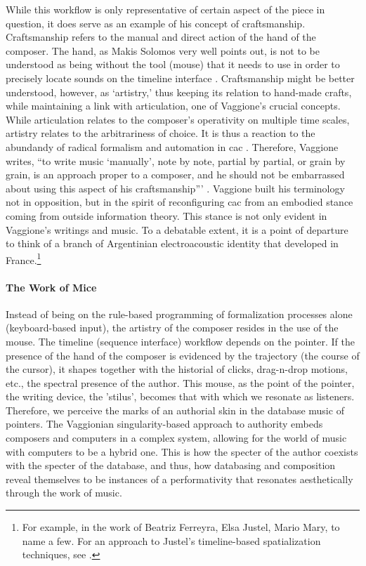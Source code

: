 While this workflow is only representative of certain aspect of the piece in question, it does serve as an example of his concept of craftsmanship. Craftsmanship refers to the manual and direct action of the hand of the composer. The hand, as Makis Solomos very well points out, is not to be understood as being without the tool (mouse) that it needs to use in order to precisely locate sounds on the timeline interface \parencite[4]{Sol05:AnI}. Craftsmanship might be better understood, however, as `artistry,' thus keeping its relation to hand-made crafts, while maintaining a link with articulation, one of Vaggione's crucial concepts. While articulation relates to the composer's operativity on multiple time scales, artistry relates to the arbitrariness of choice. It is thus a reaction to the abundandy of radical formalism and automation in \gls{cac} \parencite[3]{Sol05:AnI}. Therefore, Vaggione writes, ``to write music `manually', note by note, partial by partial, or grain by grain, is an approach proper to a composer, and he should not be embarrassed about using this aspect of his craftsmanship''' \parencite[3]{Sol05:AnI}. Vaggione built his terminology not in opposition, but in the spirit of reconfiguring \gls{cac} from an embodied stance coming from outside information theory. This stance is not only evident in Vaggione's writings and music. To a debatable extent, it is a point of departure to think of a branch of Argentinian electroacoustic identity that developed in France.\footnote{For example, in the work of Beatriz Ferreyra, Elsa Justel, Mario Mary, to name a few. For an approach to Justel's timeline-based spatialization techniques, see \parencite{fdch/papers/elsa}.} 


\paragraph{The Work of Mice}
Instead of being on the rule-based programming of formalization processes alone (keyboard-based input), the artistry of the composer resides in the use of the mouse. The timeline (sequence interface) workflow depends on the pointer. If the presence of the hand of the composer is evidenced by the trajectory (the course of the cursor), it shapes together with the historial of clicks, drag-n-drop motions, etc., the spectral presence of the author. This mouse, as the point of the pointer, the writing device, the 'stilus', becomes that with which we resonate as listeners. Therefore, we perceive the marks of an authorial skin in the database music of pointers. The Vaggionian singularity-based approach to authority embeds composers and computers in a complex system, allowing for the world of music with computers to be a hybrid one. This is how the specter of the author coexists with the specter of the database, and thus, how databasing and composition reveal themselves to be instances of a performativity that resonates aesthetically through the work of music. 
